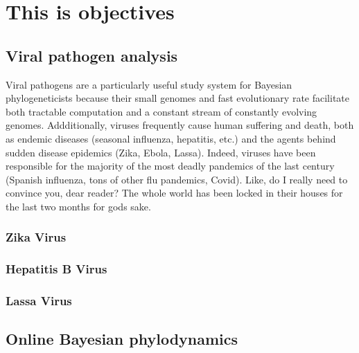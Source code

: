\chapter{This is objectives}\label{ch:objectives}

\section{Viral pathogen analysis}

Viral pathogens are a particularly useful study system for Bayesian phylogeneticists because their small genomes and fast evolutionary rate facilitate both tractable computation and a constant stream of constantly evolving genomes.
Addditionally, viruses frequently cause human suffering and death, both as endemic diseases (seasonal influenza, hepatitis, etc.) and the agents behind sudden disease epidemics (Zika, Ebola, Lassa).
Indeed, viruses have been responsible for the majority of the most deadly pandemics of the last century (Spanish influenza, tons of other flu pandemics, Covid).
Like, do I really need to convince you, dear reader?
The whole world has been locked in their houses for the last two months for gods sake.

\subsection{Zika Virus}

\subsection{Hepatitis B Virus}

\subsection{Lassa Virus}

\section{Online Bayesian phylodynamics}





\cleardoublepage

